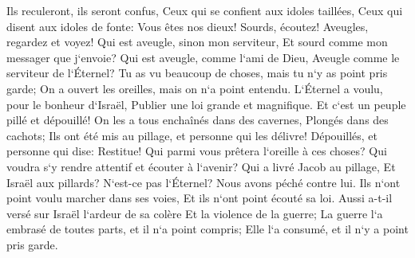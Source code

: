 \verse Ils reculeront, ils seront confus, Ceux qui se confient aux idoles taillées, Ceux qui disent aux idoles de fonte: Vous êtes nos dieux! 
\verse Sourds, écoutez! Aveugles, regardez et voyez! 
\verse Qui est aveugle, sinon mon serviteur, Et sourd comme mon messager que j`envoie? Qui est aveugle, comme l`ami de Dieu, Aveugle comme le serviteur de l`Éternel? 
\verse Tu as vu beaucoup de choses, mais tu n`y as point pris garde; On a ouvert les oreilles, mais on n`a point entendu. 
\verse L`Éternel a voulu, pour le bonheur d`Israël, Publier une loi grande et magnifique. 
\verse Et c`est un peuple pillé et dépouillé! On les a tous enchaînés dans des cavernes, Plongés dans des cachots; Ils ont été mis au pillage, et personne qui les délivre! Dépouillés, et personne qui dise: Restitue! 
\verse Qui parmi vous prêtera l`oreille à ces choses? Qui voudra s`y rendre attentif et écouter à l`avenir? 
\verse Qui a livré Jacob au pillage, Et Israël aux pillards? N`est-ce pas l`Éternel? Nous avons péché contre lui. Ils n`ont point voulu marcher dans ses voies, Et ils n`ont point écouté sa loi. 
\verse Aussi a-t-il versé sur Israël l`ardeur de sa colère Et la violence de la guerre; La guerre l`a embrasé de toutes parts, et il n`a point compris; Elle l`a consumé, et il n`y a point pris garde. 

